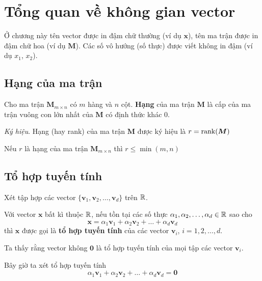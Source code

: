 \chapter{Tổng quan về không gian vector}

Ở chương này tên vector được in đậm chữ thường (ví dụ $\bm{x}$), tên ma trận được in đậm chữ hoa (ví dụ $\bm{M}$). Các số vô hướng (số thực) được viết không in đậm (ví dụ $x_1$, $x_2$).

\section{Hạng của ma trận}

\begin{definition}
    
    Cho ma trận $\bm{M}_{m \times n}$ có $m$ hàng và $n$ cột. \textbf{Hạng} của ma trận $\bm{M}$ là cấp của ma trận vuông con lớn nhất của $\bm{M}$ có định thức khác 0.

    \textit{Ký hiệu}. Hạng (hay rank) của ma trận $\bm{M}$ được ký hiệu là $r = \text{rank}(\bm{M})$

\end{definition}

\begin{remark}
    Nếu $r$ là hạng của ma trận $\bm{M}_{m \times n}$ thì $r \leq \min (m, n)$
\end{remark}

\section{Tổ hợp tuyến tính}

Xét tập hợp các vector $\{\bm{v}_1, \bm{v}_2, \ldots, \bm{v}_d\}$ trên $\mathbb{R}$.

\begin{definition}
Với vector $\bm{x}$ bất kì thuộc $\mathbb{R}$, nếu tồn tại các số thực $\alpha_1, \alpha_2, \ldots, \alpha_d \in \mathbb{R}$ sao cho
\[\bm{x} = \alpha_1 \bm{v}_1 + \alpha_2 \bm{v}_2 + \ldots + \alpha_d \bm{v}_d\]
thì $\bm{x}$ được gọi là \textbf{tổ hợp tuyến tính} của các vector $\bm{v}_i$, $i = 1, 2, \ldots, d$.
\end{definition}

Ta thấy rằng vector không $\bm{0}$ là tổ hợp tuyến tính của mọi tập các vector $\bm{v}_i$.

Bây giờ ta xét tổ hợp tuyến tính
\[\alpha_1 \bm{v}_1 + \alpha_2 \bm{v}_2 + \ldots + \alpha_d \bm{v}_d = \bm{0}\]

